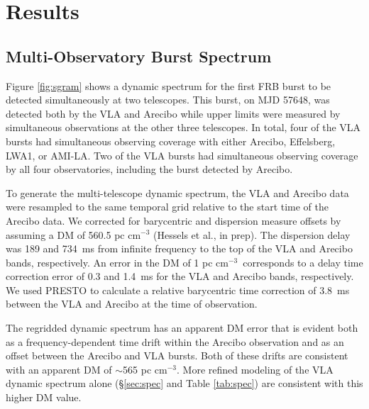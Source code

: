 \documentclass[twocolumn]{aastex61}
\begin{document}
\section{Results}
\label{sec:res}

\subsection{Multi-Observatory Burst Spectrum}

Figure \ref{fig:sgram} shows a dynamic spectrum for the first FRB burst to be detected simultaneously at two telescopes. This burst, on MJD 57648, was detected both by the VLA and Arecibo while upper limits were measured by simultaneous observations at the other three telescopes. In total, four of the VLA bursts had simultaneous observing coverage with either Arecibo, Effelsberg, LWA1, or AMI-LA. Two of the VLA bursts had simultaneous observing coverage by all four observatories, including the burst detected by Arecibo.

To generate the multi-telescope dynamic spectrum, the VLA and Arecibo data were resampled to the same temporal grid relative to the start time of the Arecibo data. We corrected for barycentric and dispersion measure offsets by assuming a DM of 560.5 pc cm$^{-3}$ (Hessels et al., in prep). The dispersion delay was 189 and 734~ms from infinite frequency to the top of the VLA and Arecibo bands, respectively. An error in the DM of 1 pc cm$^{-3}$\ corresponds to a delay time correction error of 0.3 and 1.4~ms for the VLA and Arecibo bands, respectively. We used PRESTO to calculate a relative barycentric time correction of 3.8~ms between the VLA and Arecibo at the time of observation.

The regridded dynamic spectrum has an apparent DM error that is evident both as a frequency-dependent time drift within the Arecibo observation and as an offset between the Arecibo and VLA bursts. Both of these drifts are consistent with an apparent DM of $\sim$565 pc cm$^{-3}$. More refined modeling of the VLA dynamic spectrum alone (\S \ref{sec:spec} and Table \ref{tab:spec}) are consistent with this higher DM value.
\end{document}
